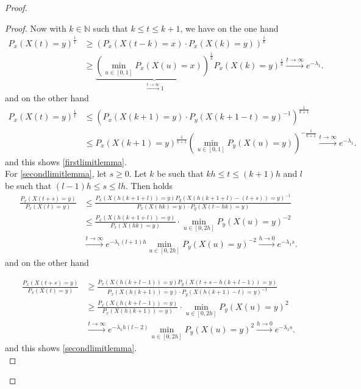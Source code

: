 \documentclass[12pt,a4paper]{scrartcl}
\numberwithin{equation}{section}
\newcommand{\N}{\mathbb{N}} %
\begin{document}
\begin{proof}
\begin{proof}
Now with $k \in \N$ such that $ k \leq t \leq k+1 $, we have on the one hand
\begin{align*}
P_x\left(X\left(t\right)=y \right)^{\frac{1}{t}} &\geq \left(P_x\left(X\left(t - k\right)=x \right)\cdot P_x\left(X\left(k\right) = y\right) \right)^{\frac{1}{k}} \\
&\geq \underbrace{\left(\min_{u \in \left[0,1\right]}P_x\left(X\left(u\right)=x\right)\right)^{\frac{1}{k}}}_{\overset{t \to \infty}{\to} 1} P_x\left(X\left(k\right) = y\right)^{\frac{1}{k}} \overset{t \to \infty}{\to} e^{-\lambda_1}.
\end{align*}
and on the other hand
\begin{align*}
P_x\left(X\left(t\right)=y \right)^{\frac{1}{t}} &\leq \left(P_x\left(X\left(k+1\right)=y \right) \cdot P_y\left(X\left(k+1-t\right)=y \right)^{-1} \right)^{\frac{1}{k+1}} \\
&\leq P_x\left(X\left(k+1\right)=y \right)^{\frac{1}{k+1}} \left(\min_{u \in \left[0,1\right]}P_y\left(X\left(u\right) = y \right)\right)^{-\frac{1}{k+1}} \overset{t \to \infty}{\to} e^{-\lambda_1}.
\end{align*}
and this shows \eqref{firstlimitlemma}. \\[3ex]
For \eqref{secondlimitlemma}, let $s \geq 0$. Let $k$ be such that $kh \leq t \leq \left(k+1\right)h$ and $l$ be such that $\left(l-1\right)h \leq s\leq lh.$ Then holds
\begin{align*}
\frac{P_x\left(X\left(t+s\right)=y\right)}{P_x\left(X\left(t\right)=y\right)} &\leq \frac{P_x\left(X\left(h\left(k+1+l\right)\right)=y \right) P_y\left(X\left(h\left(k+1+l\right)-\left(t+s\right)\right)=y\right)^{-1} }{P_x\left(X\left(hk\right)=y\right)\cdot P_y\left(X\left(t-hk\right)=y\right)} \\
&\leq \frac{P_x\left(X\left(h\left(k+1+l\right)\right)=y \right)}{P_x\left(X\left(hk\right)=y\right)} \cdot \min_{u \in \left[0,2h\right]} P_y\left(X\left(u\right)=y \right)^{-2} \\
& \overset{t \to \infty}{\to} e^{-\lambda_1 \left(l+1\right) h} \min_{u \in \left[0,2h\right]} P_y\left(X\left(u\right)=y \right)^{-2} \overset{h \to 0}{\to} e^{-\lambda_1 s}.
\end{align*}
and on the other hand

\begin{align*}
\frac{P_x\left(X\left(t+s\right)=y\right)}{P_x\left(X\left(t\right)=y\right)} &\geq \frac{ P_x\left(X\left(h\left(k+l-1\right)\right)=y \right) P_y\left(X\left(t+s-h\left(k+l-1\right)\right)=y\right)}{P_x\left(X\left(h\left(k+1\right)\right)=y\right)\cdot P_y\left(X\left(h\left(k+1\right)-t\right)=y\right)^{-1}} \\ 
&\geq \frac{P_x\left(X\left(h\left(k+l-1\right)\right)=y \right)}{P_x\left(X\left(h\left(k+1\right)\right)=y\right)} \cdot \min_{u \in \left[0,2h\right]} P_y\left(X\left(u\right)=y\right)^2 \\
& \overset{t \to \infty}{\to} e^{-\lambda_1 h \left(l-2\right)} \min_{u \in \left[0,2h\right]} P_y\left(X\left(u\right)=y\right)^2 \overset{h \to 0}{\to} e^{-\lambda_1 s}.
\end{align*}
and this shows \eqref{secondlimitlemma}. \\[2ex]


\end{proof}
\end{proof}
\end{document}
